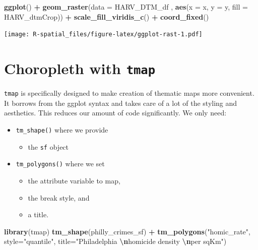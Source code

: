 \documentclass[
]{book}
\newenvironment{Shaded}{\begin{snugshade}}{\end{snugshade}}
\newcommand{\AttributeTok}[1]{\textcolor[rgb]{0.13,0.29,0.53}{#1}}
\newcommand{\FunctionTok}[1]{\textcolor[rgb]{0.13,0.29,0.53}{\textbf{#1}}}
\newcommand{\NormalTok}[1]{#1}
\newcommand{\SpecialCharTok}[1]{\textcolor[rgb]{0.81,0.36,0.00}{\textbf{#1}}}
\newcommand{\StringTok}[1]{\textcolor[rgb]{0.31,0.60,0.02}{#1}}
\providecommand{\tightlist}{%
  \setlength{\itemsep}{0pt}\setlength{\parskip}{0pt}}
\begin{document}
\begin{Shaded}
\begin{Highlighting}[]
\FunctionTok{ggplot}\NormalTok{() }\SpecialCharTok{+}
    \FunctionTok{geom\_raster}\NormalTok{(}\AttributeTok{data =}\NormalTok{ HARV\_DTM\_df , }\FunctionTok{aes}\NormalTok{(}\AttributeTok{x =}\NormalTok{ x, }\AttributeTok{y =}\NormalTok{ y, }\AttributeTok{fill =}\NormalTok{ HARV\_dtmCrop)) }\SpecialCharTok{+}
    \FunctionTok{scale\_fill\_viridis\_c}\NormalTok{() }\SpecialCharTok{+}
    \FunctionTok{coord\_fixed}\NormalTok{()}
\end{Highlighting}
\end{Shaded}

\texttt{[image: R-spatial\_files/figure-latex/ggplot-rast-1.pdf]}

\hypertarget{choropleth-with-tmap}{%
\section{\texorpdfstring{Choropleth with \texttt{tmap}}{Choropleth with tmap}}\label{choropleth-with-tmap}}

\texttt{tmap} is specifically designed to make creation of thematic maps more convenient. It borrows from the ggplot syntax and takes care of a lot of the styling and aesthetics. This reduces our amount of code significantly. We only need:

\begin{itemize}
\tightlist
\item
  \texttt{tm\_shape()} where we provide

  \begin{itemize}
  \tightlist
  \item
    the \texttt{sf} object
  \end{itemize}
\item
  \texttt{tm\_polygons()} where we set

  \begin{itemize}
  \tightlist
  \item
    the attribute variable to map,
  \item
    the break style, and
  \item
    a title.
  \end{itemize}
\end{itemize}

\begin{Shaded}
\begin{Highlighting}[]
\FunctionTok{library}\NormalTok{(tmap)}
\FunctionTok{tm\_shape}\NormalTok{(philly\_crimes\_sf) }\SpecialCharTok{+}
  \FunctionTok{tm\_polygons}\NormalTok{(}\StringTok{"homic\_rate"}\NormalTok{, }
              \AttributeTok{style=}\StringTok{"quantile"}\NormalTok{, }
              \AttributeTok{title=}\StringTok{"Philadelphia }\SpecialCharTok{\textbackslash{}n}\StringTok{homicide density }\SpecialCharTok{\textbackslash{}n}\StringTok{per sqKm"}\NormalTok{)}
\end{Highlighting}
\end{Shaded}
\end{document}

